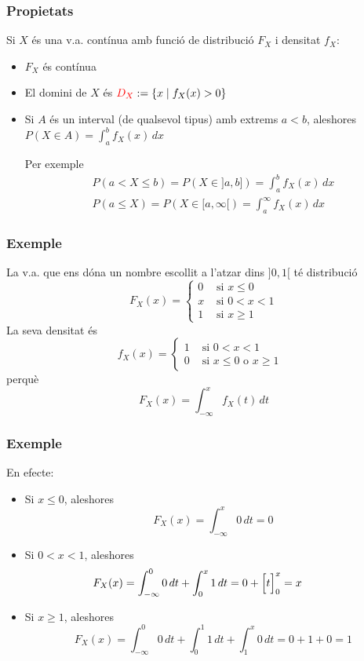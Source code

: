 \documentclass[12pt,t]{beamer}\usepackage[]{graphicx}\usepackage[]{color}
\renewcommand{\emph}[1]{{\color{red}#1}}
\renewcommand{\leq}{\leqslant}
\renewcommand{\geq}{\geqslant}
\theoremstyle{plain}
\theoremstyle{definition}
\begin{document}
\begin{frame}
\frametitle{Propietats}
Si $X$  és una v.a. contínua amb funció de distribució $F_X$ i densitat $f_X$:
\medskip

\begin{itemize} 
\item $F_{X}$ és contínua
\smallskip

\item El \emph{domini} de $X$ és $\emph{D_X}:=\{x\mid f_X(x)>0\}$
\smallskip

\item Si  $A$ és un interval (de qualsevol tipus) amb extrems $a<b$, aleshores $P(X\in A)=\int_a^b f_X(x)\, dx$
\smallskip

Per exemple
$$
\begin{array}{l}
\displaystyle P(a<X\leq b)=P(X\in ]a,b])=\int_{a}^b f_X(x)\, dx\\[2ex]
\displaystyle P(a\leq X)=P(X\in [a,\infty[)=\int_{a}^\infty f_X(x)\, dx
\end{array}
$$
\end{itemize}
\end{frame}

\begin{frame}
\frametitle{Exemple}

La v.a. que ens dóna un nombre escollit a l'atzar dins $]0,1[$ té distribució
$$
F_X(x)=\left\{\begin{array}{ll} 0 &\mbox{ si } x\leq 0 \\
x  & \mbox{ si } 0<x<1\\
1 & \mbox{ si } x\geq 1
 \end{array}\right.
$$
La seva densitat és
$$
f_X(x)=\left\{\begin{array}{ll} 1 &\mbox{ si } 0 <x<1 \\
0 & \mbox{ si $x\leq 0$ o $x\geq 1$ } 
 \end{array}\right.
$$
perquè
$$
F_X(x)=\int_{-\infty}^x f_X(t)\, dt
$$
\end{frame}


\begin{frame}
\frametitle{Exemple}
\vspace*{-2ex}

En efecte:

\begin{itemize}
    \item Si $x\leq 0$, aleshores 
    $$
    F_X(x)=
\int_{-\infty}^{x}
    0\, dt =0
    $$
    \item Si $0<x<1$, aleshores
$$
\hspace*{-1cm}    F_X(x)=  \int_{-\infty}^{0}
    0\, dt+\int_{0}^{x} 1\, dt = 0+
    \Big[t\Big]_{0}^{x}=x
$$
\item  Si $x\geq 1$, aleshores 
$$
    F_X(x) = \int_{-\infty}^{0}
    0\, dt+\int_{0}^{1} 1\, dt+ \int_1^x 0\,dt= 0+1+0=1
$$


\end{itemize}
\end{frame}
\end{document}
